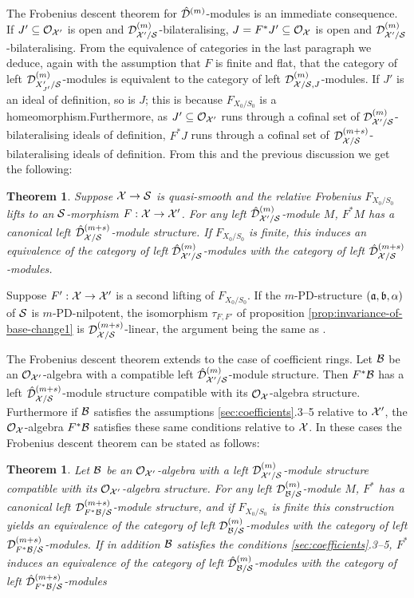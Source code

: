 \documentclass{article}
\theoremstyle{change}
\newtheorem{thm}[subsubsection]{Theorem}
\numberwithin{equation}{subsubsection}
\begin{document}
The Frobenius descent theorem for ${\hat{\cal D}}^{({m})}$-modules is an
immediate consequence. If $J'\subseteq{\cal O}_{{\cal X}'}$ is open and
${{\cal D}}^{({m})}_{{\cal X}'/{\cal S}}$-bilateralising, $J=F^*J'\subseteq{\cal O}_{\cal X}$ is open
and ${{\cal D}}^{({m})}_{{\cal X}'/{\cal S}}$-bilateralising. From the equivalence of
categories in the last paragraph we deduce, again with the assumption
that $F$ is finite and flat, that the category of left
${{\cal D}}^{({m})}_{X'_{J'}/{\cal S}}$-modules is equivalent to the category of
left ${{\cal D}}^{({m})}_{{\cal X}/{\cal S},J}$-modules. If $J'$ is an ideal of
definition, so is $J$; this is because $F_{X_0/S_0}$ is a
homeomorphism.Furthermore, as $J'\subseteq{\cal O}_{{\cal X}'}$ runs through a
cofinal set of ${{\cal D}}^{({m})}_{{\cal X}'/{\cal S}}$-bilateralising ideals of
definition, $F^*J$ runs through a cofinal set of
${{\cal D}}^{({m+s})}_{{\cal X}/{\cal S}}$-bilateralising ideals of definition. From
this and the previous discussion we get the following:

\begin{thm}\label{thm:Frobenius-descent-Dhat}
  Suppose ${\cal X}\to{\cal S}$ is quasi-smooth and the relative Frobenius
  $F_{X_0/S_0}$ lifts to an ${\cal S}$-morphism $F:{\cal X}\to{\cal X}'$. For any
  left ${\hat{\cal D}}^{({m})}_{{\cal X}'/{\cal S}}$-module $M$, $F^*M$ has a canonical
  left ${\hat{\cal D}}^{({m+s})}_{{\cal X}/{\cal S}}$-module structure. If $F_{X_0/S_0}$
  is finite, this induces an equivalence of the category of left
  ${\hat{\cal D}}^{({m})}_{{\cal X}'/{\cal S}}$-modules with the category of left
  ${\hat{\cal D}}^{({m+s})}_{{\cal X}/{\cal S}}$-modules.
\end{thm}

Suppose $F':{\cal X}\to{\cal X}'$ is a second lifting of $F_{X_0/S_0}$. If the
$m$-PD-structure $({\mathfrak a},{\mathfrak b},\alpha)$ of ${\cal S}$ is $m$-PD-nilpotent, the
isomorphism $\tau_{F,F'}$ of proposition
\ref{prop:invariance-of-base-change1} is
${{\cal D}}^{({m+s})}_{{\cal X}/{\cal S}}$-linear, the argument being the same as
\cite[Prop. 2.2.5]{berthelot:1996}.

The Frobenius descent theorem extends to the case of coefficient
rings. Let ${\cal B}$ be an ${\cal O}_{{\cal X}'}$-algebra with a compatible left
${\hat{\cal D}}^{({m})}_{{\cal X}'/{\cal S}}$-module structure. Then $F^*{\cal B}$ has a left
${\hat{\cal D}}^{({m+s})}_{{\cal X}/{\cal S}}$-module structure compatible with its
${\cal O}_{\cal X}$-algebra structure. Furthermore if ${\cal B}$ satisfies the
assumptions \ref{sec:coefficients}.3--5 relative to ${\cal X}'$, the
${\cal O}_{\cal X}$-algebra $F^*{\cal B}$ satisfies these same conditions relative to
${\cal X}$. In these cases the Frobenius descent theorem can be stated as
follows:

\begin{thm}\label{thm:Frobenius-descent-with-coefficients}
  Let ${\cal B}$ be an ${\cal O}_{{\cal X}'}$-algebra with a left
  ${{\cal D}}^{({m})}_{{\cal X}'/{\cal S}}$-module structure compatible with its
  ${\cal O}_{{\cal X}'}$-algebra structure. For any left
  ${{\cal D}}^{({m})}_{{\cal B}/{\cal S}}$-module $M$, $F^*$ has a canonical left
  ${{\cal D}}^{({m+s})}_{F^*{\cal B}/{\cal S}}$-module structure, and if $F_{X_0/S_0}$
  is finite this construction yields an equivalence of the category of
  left ${{\cal D}}^{({m})}_{{\cal B}/{\cal S}}$-modules with the category of left
  ${{\cal D}}^{({m+s})}_{F^*{\cal B}/{\cal S}}$-modules. If in addition ${\cal B}$ satisfies
  the conditions \ref{sec:coefficients}.3--5, $F^*$ induces an
  equivalence of the category of left ${\hat{\cal D}}^{({m})}_{{\cal B}/{\cal S}}$-modules
  with the category of left ${\hat{\cal D}}^{({m+s})}_{F^*{\cal B}/{\cal S}}$-modules
\end{thm}
\end{document}
